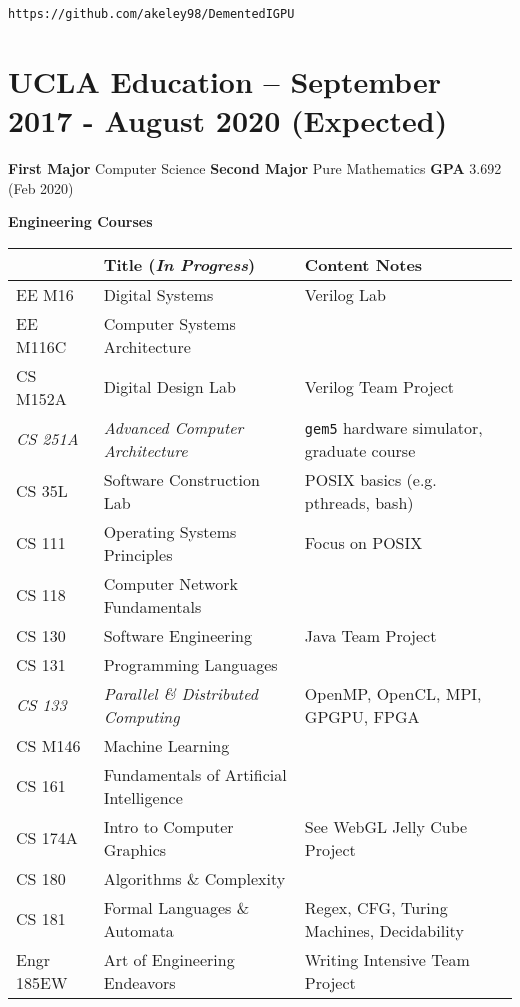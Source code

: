 \documentclass[11pt]{article}
\begin{document}
\quad\texttt{https://github.com/akeley98/DementedIGPU}

\section{UCLA Education -- September 2017 - August 2020 (Expected)}

\textbf{First Major} Computer Science \hfill\textbf{Second Major} Pure
Mathematics \hfill\textbf{GPA} 3.692 (Feb 2020)


\textbf{Engineering Courses}

\begin{tabular}{|l l l|}
\hline
 & Title (\textit{In Progress}) & Content Notes \\
\hline
EE M16 & Digital Systems & Verilog Lab \\
EE M116C & Computer Systems Architecture & \\
CS M152A & Digital Design Lab & Verilog Team Project \\
\textit{CS 251A} & \textit{Advanced Computer Architecture} & \texttt{gem5} hardware simulator, graduate course \\
\hline
CS 35L & Software Construction Lab & POSIX basics (e.g. pthreads, bash) \\
CS 111 & Operating Systems Principles & Focus on POSIX \\
CS 118 & Computer Network Fundamentals & \\
CS 130 & Software Engineering & Java Team Project \\
CS 131 & Programming Languages & \\
\textit{CS 133} & \textit{Parallel \& Distributed Computing} & OpenMP, OpenCL, MPI, GPGPU, FPGA \\
CS M146 & Machine Learning & \\
CS 161 & Fundamentals of Artificial Intelligence & \\
CS 174A & Intro to Computer Graphics & See WebGL Jelly Cube Project \\
CS 180 & Algorithms \& Complexity & \\
CS 181 & Formal Languages \& Automata & Regex, CFG, Turing Machines, Decidability \\
\hline
Engr 185EW & Art of Engineering Endeavors & Writing Intensive Team Project \\
\hline
\end{tabular}
\end{document}
